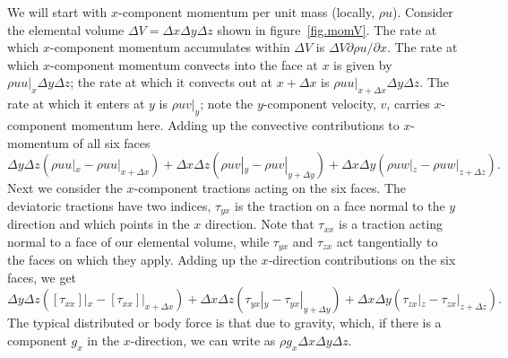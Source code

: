 \documentclass[a4paper,11pt]		{report}
\begin{document}
We will start with $x$-component momentum per unit mass (locally,
$\rho u$).  Consider the elemental volume $\Delta V=\Delta x\Delta
y\Delta z$ shown in figure~\ref{fig.momV}. The rate at which
$x$-component momentum accumulates within $\Delta V$ is $\Delta
V\partial \rho u/\partial x$. The rate at which $x$-component momentum
convects into the face at $x$ is given by $\rho uu|_{x}\Delta y\Delta
z$; the rate at which it convects out at $x+\Delta x$ is $\rho
uu|_{x+\Delta x}\Delta y\Delta z$. The rate at which it enters at $y$
is $\rho uv|_y$; note the $y$-component velocity, $v$, carries
$x$-component momentum here. Adding up the convective contributions to
$x$-momentum of all six faces
\begin{equation}
\Delta y\Delta z(\rho uu|_x-\rho uu|_{x+\Delta x})+\Delta x\Delta
z(\rho uv|_y-\rho uv|_{y+\Delta y})+\Delta x\Delta y(\rho uw|_z-\rho
uw|_{z+\Delta z}).
\end{equation}
Next we consider the $x$-component tractions acting on the six
faces. The deviatoric tractions have two indices, \eg $\tau_{yx}$ is
the traction on a face normal to the $y$ direction and which points in
the $x$ direction. Note that $\tau_{xx}$ is a traction acting normal
to a face of our elemental volume, while $\tau_{yx}$ and $\tau_{zx}$
act tangentially to the faces on which they apply. Adding up the
$x$-direction contributions on the six faces, we get
\begin{equation}
\Delta y\Delta z([\tau_{xx}]|_x-[\tau_{xx}]|_{x+\Delta x})+\Delta x\Delta
z(\tau_{yx}|_y-\tau_{yx}|_{y+\Delta y})+\Delta x\Delta
y(\tau_{zx}|_z-\tau_{zx}|_{z+\Delta z}).
\end{equation}
The typical distributed or body force is that due to gravity, which,
if there is a component $g_x$ in the $x$-direction, we can write as
$\rho g_x \Delta x\Delta y\Delta z$.
\end{document}
